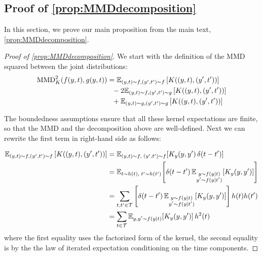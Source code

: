 \subsection{Proof of \cref{prop:MMDdecomposition}}
\label{app:proof-main-prop}
In this section, we prove our main proposition from the main text, \cref{prop:MMDdecomposition}.
\begin{proof}[Proof of \cref{prop:MMDdecomposition}]
We start with the definition of the MMD squared between the joint distributions:
\begin{equation}
\begin{aligned}
    \MMD^2_{K}(f(\statevar,t),g(\statevar,t))&=\E_{(\statevar,t)\sim f, (\statevar',t')\sim f}\left[K((\statevar,t), (\statevar',t'))\right]\\
    &~~-2\E_{(\statevar,t)\sim f, (\statevar',t')\sim g}\left[K((\statevar,t), (\statevar',t'))\right]\\
    &~~+\E_{(\statevar,t)\sim g, (\statevar',t')\sim g}\left[K((\statevar,t), (\statevar',t'))\right]
\end{aligned}
\end{equation}

The boundedness assumptions ensure that all these kernel expectations are finite, so that the MMD and the decomposition above are well-defined. Next we can rewrite the first term in right-hand side as follows:

\begin{equation}
\begin{aligned}
\E_{(\statevar,t)\sim f, (\statevar',t')\sim f}\left[K((\statevar,t), (\statevar',t'))\right]&=\mathbb{E}_{(\statevar,t)\sim f,\; (\statevar',t')\sim f}\!\left[K_{\statevar}(\statevar,\statevar')\,\delta(t-t')\right]\\
&=\mathbb{E}_{t\sim h(t),\; t'\sim h(t')}\!\left[\delta(t-t')\,\mathbb{E}_{\substack{\statevar\sim f(\statevar\mid t) \\ \statevar'\sim f(\statevar\mid t')}}\!\left[K_{\statevar}(\statevar,\statevar')\right]\right]\\
&=\sum_{t,t'\in \timerange}\left[\delta(t-t')\,\mathbb{E}_{\substack{\statevar\sim f(\statevar\mid t) \\ \statevar'\sim f(\statevar\mid t')}}\!\left[K_{\statevar}(\statevar,\statevar')\right]\right]h(t)h(t')\\
&=\sum_{t\in \timerange} \mathbb{E}_{\substack{\statevar, \statevar'\sim f(\statevar\mid t)}}\!\left[K_{\statevar}(\statevar,\statevar')\right]h^2(t)
\end{aligned}
\end{equation}
where the first equality uses the factorized form of the kernel, the second equality is by the the law of iterated expectation conditioning on the time components.


\end{proof}
